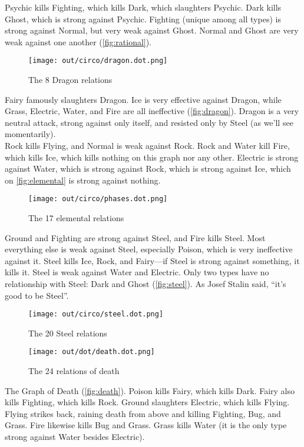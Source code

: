 \noindent{}Psychic kills Fighting, which kills Dark, which slaughters Psychic.
Dark kills Ghost, which is strong against Psychic.
Fighting (unique among all types) is strong against Normal,
  but very weak against Ghost.
Normal and Ghost are very weak against one another (\autoref{fig:rational}).

\begin{figure}[h!]
\centering
\texttt{[image: out/circo/dragon.dot.png]}
\caption{The 8 Dragon relations\label{fig:dragon}}
\end{figure}
\noindent{}Fairy famously slaughters Dragon.
Ice is very effective against Dragon, while Grass, Electric, Water, and Fire are all ineffective (\autoref{fig:dragon}).
Dragon is a very neutral attack, strong against only itself, and resisted only by Steel (as we'll see momentarily).
\\

\noindent{}Rock kills Flying, and Normal is weak against Rock.
Rock and Water kill Fire, which kills Ice, which kills nothing on this graph nor any other.
Electric is strong against Water, which is strong against Rock, which is strong against Ice,
 which on \autoref{fig:elemental} is strong against nothing.
\clearpage
\begin{figure}[ht]
\centering
\texttt{[image: out/circo/phases.dot.png]}
\caption{The 17 elemental relations\label{fig:elemental}}
\end{figure}

\noindent{}Ground and Fighting are strong against Steel, and Fire kills Steel.
Most everything else is weak against Steel, especially
 Poison, which is very ineffective against it.
Steel kills Ice, Rock, and Fairy---if Steel is strong against something, it kills it.
Steel is weak against Water and Electric.
Only two types have no relationship with Steel: Dark and Ghost (\autoref{fig:steel}).
As Josef Stalin said, ``it's good to be Steel''.
\begin{figure}[h!]
\centering
\texttt{[image: out/circo/steel.dot.png]}
\caption{The 20 Steel relations\label{fig:steel}}
\end{figure}

\clearpage
\begin{figure}[h!]
\centering
\texttt{[image: out/dot/death.dot.png]}
\caption{The 24 relations of death\label{fig:death}}
\end{figure}
\noindent{}The Graph of Death (\autoref{fig:death}).
Poison kills Fairy, which kills Dark.
Fairy also kills Fighting, which kills Rock.
Ground slaughters Electric, which kills Flying.
Flying strikes back, raining death from above and killing Fighting, Bug, and Grass.
Fire likewise kills Bug and Grass.
Grass kills Water (it is the only type strong against Water besides Electric).

